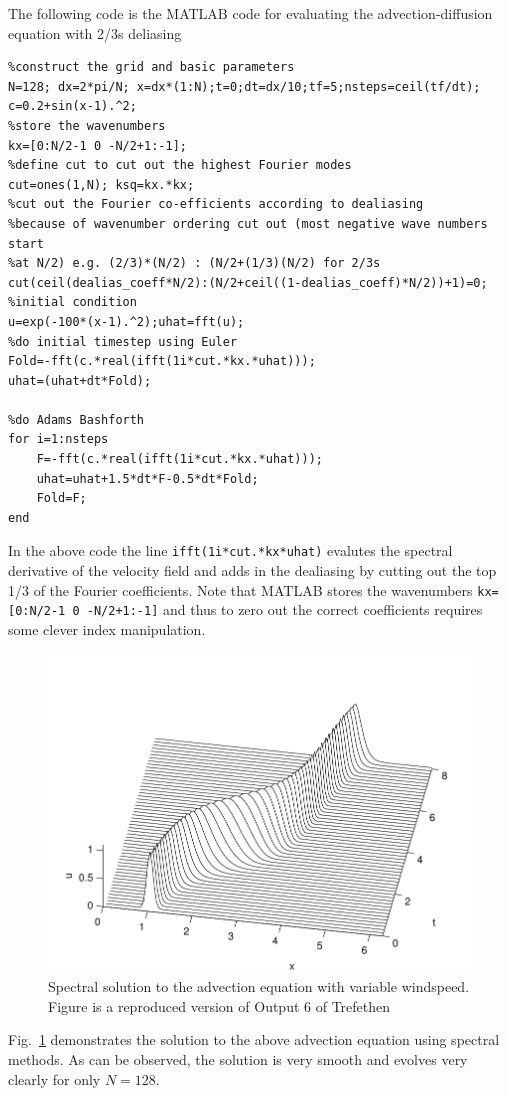 The following code is the MATLAB code for evaluating the advection-diffusion equation with 2/3s deliasing
\begin{verbatim}
%construct the grid and basic parameters
N=128; dx=2*pi/N; x=dx*(1:N);t=0;dt=dx/10;tf=5;nsteps=ceil(tf/dt);
c=0.2+sin(x-1).^2;
%store the wavenumbers
kx=[0:N/2-1 0 -N/2+1:-1];
%define cut to cut out the highest Fourier modes
cut=ones(1,N); ksq=kx.*kx;
%cut out the Fourier co-efficients according to dealiasing 
%because of wavenumber ordering cut out (most negative wave numbers start
%at N/2) e.g. (2/3)*(N/2) : (N/2+(1/3)(N/2) for 2/3s
cut(ceil(dealias_coeff*N/2):(N/2+ceil((1-dealias_coeff)*N/2))+1)=0;
%initial condition
u=exp(-100*(x-1).^2);uhat=fft(u);
%do initial timestep using Euler
Fold=-fft(c.*real(ifft(1i*cut.*kx.*uhat)));
uhat=(uhat+dt*Fold); 

%do Adams Bashforth
for i=1:nsteps
    F=-fft(c.*real(ifft(1i*cut.*kx.*uhat)));
    uhat=uhat+1.5*dt*F-0.5*dt*Fold;
    Fold=F;
end
\end{verbatim}
In the above code the line \texttt{ifft(1i*cut.*kx*uhat)} evalutes the spectral derivative of the velocity field and adds in the dealiasing by cutting out the top 1/3 of the Fourier coefficients. Note that MATLAB stores the wavenumbers \texttt{kx=[0:N/2-1 0 -N/2+1:-1]} and thus to zero out the correct coefficients requires some clever index manipulation. 
\begin{figure}
\begin{center}
\includegraphics[width=\textwidth]{spectral_example.pdf}
\caption{Spectral solution to the advection equation with variable windspeed. Figure is a reproduced version of Output 6 of Trefethen \cite{trefethen_spectral}}
\label{spectral_example}
\end{center}
\end{figure}
Fig.~\ref{spectral_example} demonstrates the solution to the above advection equation using spectral methods. As can be observed, the solution is very smooth and evolves very clearly for only $N=128$.


